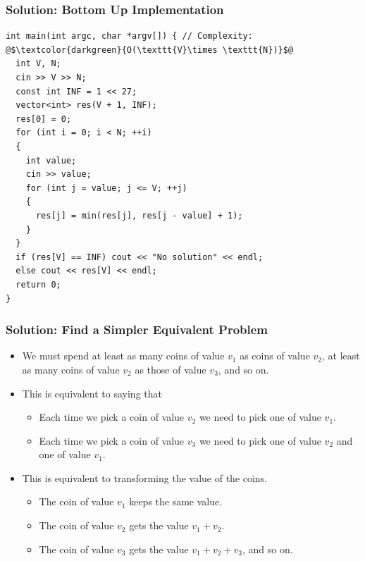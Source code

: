 \documentclass{beamer}
\newcommand{\spojlink}[2]{Sphere Online Judge (http://www.spoj.com)
  problem: \href{#2}{\textcolor{blue}{#1}.}}
\newcounter{exo}
\newcommand{\exo}{
  \addtocounter{exo}{1}
  Exercice \arabic{exo}
}
\begin{document}
\begin{frame}[containsverbatim]
\frametitle{Solution: Bottom Up Implementation}

\scriptsize
\begin{lstlisting}
int main(int argc, char *argv[]) { // Complexity: @$\textcolor{darkgreen}{O(\texttt{V}\times \texttt{N})}$@
  int V, N;
  cin >> V >> N;
  const int INF = 1 << 27;
  vector<int> res(V + 1, INF);
  res[0] = 0;
  for (int i = 0; i < N; ++i)
  {
    int value;
    cin >> value;
    for (int j = value; j <= V; ++j)
    {
      res[j] = min(res[j], res[j - value] + 1);
    }
  }
  if (res[V] == INF) cout << "No solution" << endl;
  else cout << res[V] << endl;
  return 0;
}
\end{lstlisting}

\end{frame}



\ifanswers

\begin{frame}%
\frametitle{Solution: Find a Simpler Equivalent Problem}

\begin{itemize}

\item We must spend at least as many coins of value $v_1$ as coins of value $v_2$,
at least as many coins of value $v_2$ as those of value $v_3$, and so on.

\vspace{0.2cm}

\item<2-> This is equivalent to saying that
\begin{itemize}
\item<2-> Each time we pick a coin of value $v_2$ we need to pick one
of value $v_1$.
\item<3-> Each time we pick a coin of value $v_3$ we need to pick one
of value $v_2$ and one of value $v_1$.
\end{itemize}

\vspace{0.2cm}

\item<4-> This is equivalent to transforming the value of the coins.
\begin{itemize}
\item<5-> The coin of value $v_1$ keeps the same value.
\item<6-> The coin of value $v_2$ gets the value $v_1 + v_2$.
\item<7-> The coin of value $v_3$ gets the value $v_1 + v_2 + v_3$, and so on.
\end{itemize}


\end{itemize}

\end{frame}
\end{document}
